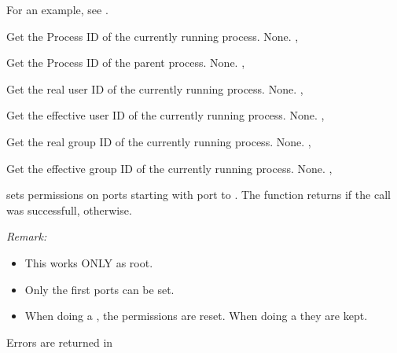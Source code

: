 For an example, see .

{ Get the Process ID of the currently running process.}
{None.}
{, }




{ Get the Process ID of the parent process.}
{None.}
{, }



{ Get the real user ID of the currently running process.}
{None.}
{,  }



{ Get the effective user ID of the currently running process.}
{None.}
{,  }



{ Get the real group ID of the currently running process.}
{None.}
{,  }



{ Get the effective group ID of the currently running process.}
{None.}
{,  }



{
  sets permissions on  ports starting with port  to 
  . The function returns  if the call was successfull,
   otherwise.

{\em Remark:}
\begin{itemize}
\item This works ONLY as root.
\item Only the first  ports can be set.
\item When doing a , the permissions are reset. When doing a
 they are kept.
\end{itemize}
}{Errors are returned in }{}

